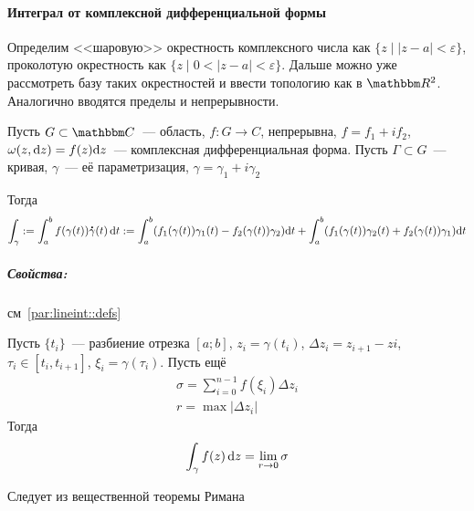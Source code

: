 \documentclass[12pt,timbord]{../../../notes}
\begin{document}
\paragraph{\underdev Интеграл от комплексной дифференциальной формы}
\label{par:tfcv::compint}

\begin{defn}\label{defn:tfcv::compint::limit}
  Определим <<шаровую>> окрестность комплексного числа как $\{z\mid |z-a|<\varepsilon\}$,
  проколотую окрестность как $\{z\mid 0<|z-a|<\varepsilon\}$. Дальше
  можно уже рассмотреть базу таких окрестностей и ввести топологию как в $\R^2$.
  Аналогично вводятся пределы и непрерывности.
\end{defn}
\begin{defn}\label{defn:tfcv::compint::compintform}
  Пусть $G\subset\C$~--- область, $f\colon G\to C$, непрерывна, $f = f_1 + i f_2$, 
  $\omega(z,\mathrm{d} z) = f(z) \mathrm{d}
  z$~--- комплексная дифференциальная форма.  Пусть $\Gamma\subset G$~---  кривая, $\gamma$~--- её
  параметризация, $\gamma = \gamma_1 + i\gamma_2$

  Тогда 
  \[
    \int_\gamma := \int_a^b f(\gamma(t)) \accentset{\mbox{\bfseries .}}{\gamma}(t) \, \mathrm{d} t 
    := \int_a^b (f_1(\gamma(t))\gamma_1(t) - f_2(\gamma(t))\gamma_2)\mathrm{d} t
    + \int_a^b (f_1(\gamma(t))\gamma_2(t) + f_2(\gamma(t))\gamma_1)\mathrm{d} t
  \]
\end{defn}

\subparagraph{Свойства:}
\begin{prop}\label{prop:tfcv::compint::intprop}
  см~\ref{par:lineint::defs}
\end{prop}
  
\begin{prop}\label{prop:tfcv::compint::intsum}
  Пусть 
  $\{t_i\}$~--- разбиение отрезка $[a;b]$, $z_i = \gamma(t_i)$, $\Delta z_i = z_{i+1} -
  z{i}$, $\tau_i \in [t_i, t_{i+1}]$, $\xi_i = \gamma(\tau_i)$. Пусть ещё
  \[
    \begin{split}
      \sigma = \sum_{i=0}^{n-1} f(\xi_i) \Delta z_i \\
      r = \max {|\Delta z_i|}
    \end{split}
  \]
  Тогда
  \[
    \displaystyle \int_\gamma f(z)\,\mathrm{d} z = \lim_{r\to 0} \sigma
  \]
\end{prop}
\begin{itlproof}
  Следует из вещественной теоремы Римана
\end{itlproof}
\end{document}
